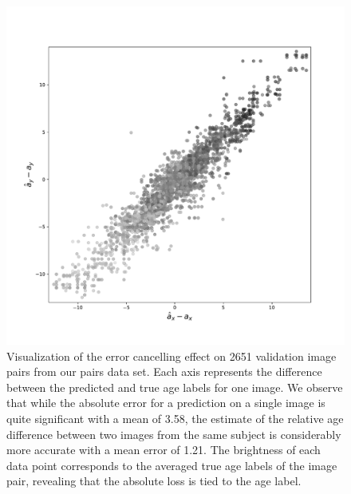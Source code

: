\begin{figure}
	\centering
	\includegraphics[width=.8\linewidth]{images/age_plots/xr_yr} 
	\vspace*{-15pt}
	\caption{Visualization of the error cancelling effect on 2651 validation image pairs from our pairs data set. Each axis represents the difference between the predicted and true age labels for one image. We observe that while the absolute error for a prediction on a single image is quite significant with a mean of 3.58, the estimate of the relative age difference between two images from the same subject is considerably more accurate with a mean error of 1.21. The brightness of each data point corresponds to the averaged true age labels of the image pair, revealing that the absolute loss is tied to the age label.}
	\label{fig:expregxryr}
\end{figure}

